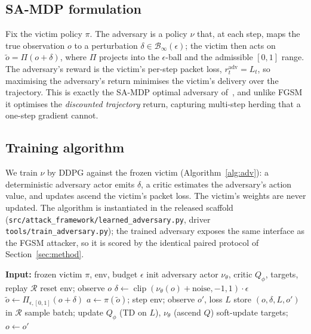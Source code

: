 \documentclass[10pt,journal,comsoc]{IEEEtran}
\begin{document}
\subsection{SA-MDP formulation}
Fix the victim policy $\pi$. The adversary is a policy $\nu$ that, at each step, maps
the true observation $o$ to a perturbation $\delta\in\mathcal{B}_\infty(\epsilon)$; the
victim then acts on $\tilde o = \Pi(o+\delta)$, where $\Pi$ projects into the
$\epsilon$-ball and the admissible $[0,1]$ range. The adversary's reward is the
victim's per-step packet loss, $r^\text{adv}_t = L_t$, so maximising the adversary's
return minimises the victim's delivery over the trajectory. This is exactly the SA-MDP
optimal adversary of~\cite{zhang2020robust}, and unlike FGSM it optimises the
\emph{discounted trajectory} return, capturing multi-step herding that a one-step
gradient cannot.

\subsection{Training algorithm}
We train $\nu$ by DDPG against the frozen victim (Algorithm~\ref{alg:adv}): a
deterministic adversary actor emits $\delta$, a critic estimates the adversary's
action value, and updates ascend the victim's packet loss. The victim's weights are
never updated. The algorithm is instantiated in the released scaffold
(\texttt{src/attack\_framework/learned\_adversary.py}, driver
\texttt{tools/train\_adversary.py}); the trained adversary exposes the same interface
as the FGSM attacker, so it is scored by the identical paired protocol of
Section~\ref{sec:method}.

\begin{algorithm}[t]
\caption{Learned observation adversary (SA-MDP, DDPG)}
\label{alg:adv}
\begin{algorithmic}[1]
\State \textbf{Input:} frozen victim $\pi$, env, budget $\epsilon$
\State init adversary actor $\nu_\theta$, critic $Q_\phi$, targets, replay $\mathcal{R}$
  \State reset env; observe $o$
    \State $\delta \gets \operatorname{clip}(\nu_\theta(o)+\text{noise},-1,1)\cdot\epsilon$
    \State $\tilde o \gets \Pi_{\epsilon,[0,1]}(o+\delta)$ 
    \State $a \gets \pi(\tilde o)$; step env; observe $o'$, loss $L$
    \State store $(o,\delta,L,o')$ in $\mathcal{R}$
    \State sample batch; update $Q_\phi$ (TD on $L$), $\nu_\theta$ (ascend $Q$)
    \State soft-update targets; $o\gets o'$
  \EndFor
\EndFor
\end{algorithmic}
\end{algorithm}
\end{document}
